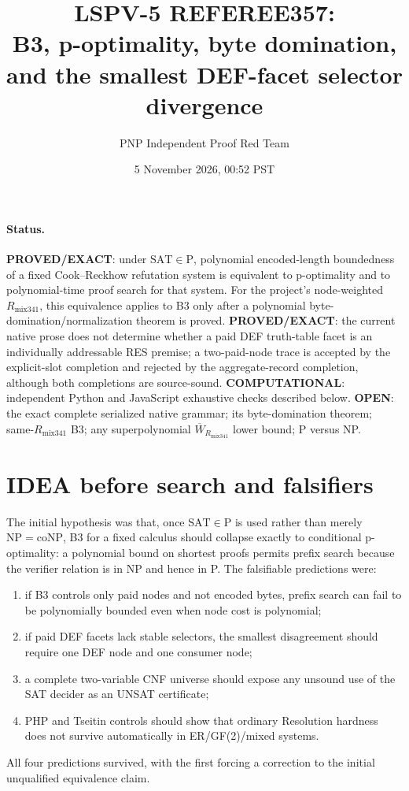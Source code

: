 \documentclass[11pt]{article}
\title{LSPV-5 REFEREE357:\\B3, p-optimality, byte domination, and the smallest DEF-facet selector divergence}
\author{PNP Independent Proof Red Team}
\date{5 November 2026, 00:52 PST}
\begin{document}
\maketitle

\paragraph{Status.}
\textbf{PROVED/EXACT}: under $\mathrm{SAT}\in\mathrm P$, polynomial encoded-length boundedness of a fixed Cook--Reckhow refutation system is equivalent to p-optimality and to polynomial-time proof search for that system.  For the project's node-weighted $R_{\mathrm{mix341}}$, this equivalence applies to B3 only after a polynomial byte-domination/normalization theorem is proved.  \textbf{PROVED/EXACT}: the current native prose does not determine whether a paid DEF truth-table facet is an individually addressable RES premise; a two-paid-node trace is accepted by the explicit-slot completion and rejected by the aggregate-record completion, although both completions are source-sound.  \textbf{COMPUTATIONAL}: independent Python and JavaScript exhaustive checks described below.  \textbf{OPEN}: the exact complete serialized native grammar; its byte-domination theorem; same-$R_{\mathrm{mix341}}$ B3; any superpolynomial $\overline W_{R_{\mathrm{mix341}}}$ lower bound; P versus NP.

\section{IDEA before search and falsifiers}

The initial hypothesis was that, once $\mathrm{SAT}\in\mathrm P$ is used rather than merely $\mathrm{NP}=\mathrm{coNP}$, B3 for a fixed calculus should collapse exactly to conditional p-optimality: a polynomial bound on shortest proofs permits prefix search because the verifier relation is in NP and hence in P.  The falsifiable predictions were:
\begin{enumerate}
\item if B3 controls only paid nodes and not encoded bytes, prefix search can fail to be polynomially bounded even when node cost is polynomial;
\item if paid DEF facets lack stable selectors, the smallest disagreement should require one DEF node and one consumer node;
\item a complete two-variable CNF universe should expose any unsound use of the SAT decider as an UNSAT certificate;
\item PHP and Tseitin controls should show that ordinary Resolution hardness does not survive automatically in ER/GF(2)/mixed systems.
\end{enumerate}
All four predictions survived, with the first forcing a correction to the initial unqualified equivalence claim.
\end{document}
